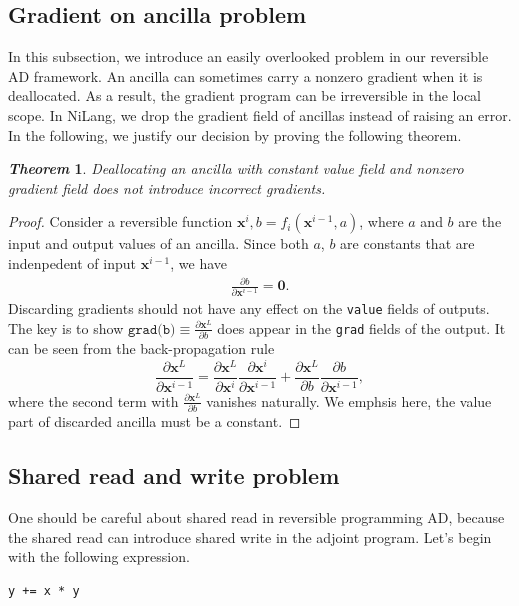 \documentclass{article}
\newcommand{\<}{\langle}
\renewcommand{\>}{\rangle}
\newcommand{\vx}{{\mathbf{x}}}
\newtheorem{theorem}{\textit{Theorem}}
\theoremstyle{definition}\newtheorem{definition}{\textit{Definition}}
\begin{document}
\subsection{Gradient on ancilla problem}
In this subsection, we introduce an easily overlooked problem in our reversible AD framework.
An ancilla can sometimes carry a nonzero gradient when it is deallocated. As a result, the gradient program can be irreversible in the local scope.
In NiLang, we drop the gradient field of ancillas instead of raising an error.
In the following, we justify our decision by proving the following theorem.
\begin{theorem}
    Deallocating an ancilla with constant value field and nonzero gradient field does not introduce incorrect gradients.
\end{theorem}
\begin{proof}
    Consider a reversible function $\vx^i, b = f_i(\vx^{i-1}, a)$, where $a$ and $b$ are the input and output values of an ancilla.
    Since both $a$, $b$ are constants that are indenpedent of input $\vx^{i-1}$, we have
\begin{align}
    \frac{\partial b}{\partial \vx^{i-1}} = \mathbf{0}.
\end{align}
Discarding gradients should not have any effect on the \texttt{value} fields of outputs.
    The key is to show $\texttt{grad(b)} \equiv \frac{\partial \vx^L}{\partial{b}}$ does appear in the \texttt{grad} fields of the output. It can be seen from the back-propagation rule 
\begin{equation}
    \frac{\partial \vx^L}{\partial \vx^{i-1}} = \frac{\partial \vx^L}{\partial \vx^i}\frac{\partial \vx^i}{\partial \vx^{i-1}} + \frac{\partial \vx^L}{\partial b}\frac{\partial b}{\partial \vx^{i-1}},
\end{equation}
where the second term with $\frac{\partial \vx^L}{\partial{b}}$ vanishes naturally. We emphsis here, the value part of discarded ancilla must be a constant.
\end{proof}

\subsection{Shared read and write problem}\label{sec:sharedrw}
One should be careful about shared read in reversible programming AD, because the shared read can introduce shared write in the adjoint program.
Let's begin with the following expression.

\begin{minipage}{.88\columnwidth}
\begin{lstlisting}
y += x * y
\end{lstlisting}
\end{minipage}
\end{document}
